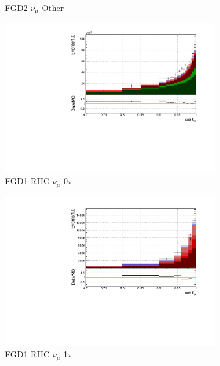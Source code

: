 \begin{figure}
\begin{subfigure}{.32\textwidth}
  \caption{FGD2 $\nu_{\mu}$ Other}
  \label{fig:tstack_FGD2_numuCC_other}
\end{subfigure}
\centering
\begin{subfigure}{.32\textwidth}
  \centering
  \includegraphics[width=0.95\linewidth]{figs/FGD1_anti-numuCC_0pi_t}
  \caption{FGD1 RHC $\bar{\nu_{\mu}}$ 0$\pi$}
  \label{fig:tstack_FGD1_anti-numuCC_0pi}
\end{subfigure}
\begin{subfigure}{.32\textwidth}
  \centering
  \includegraphics[width=0.95\linewidth]{figs/FGD1_anti-numuCC_1pi_t}
  \caption{FGD1 RHC $\bar{\nu_{\mu}}$ 1$\pi$}
  \label{fig:tstack_FGD1_anti-numuCC_1pi}
\end{subfigure}
\begin{subfigure}{.32\textwidth}
  \centering

\end{subfigure}
\end{figure}
